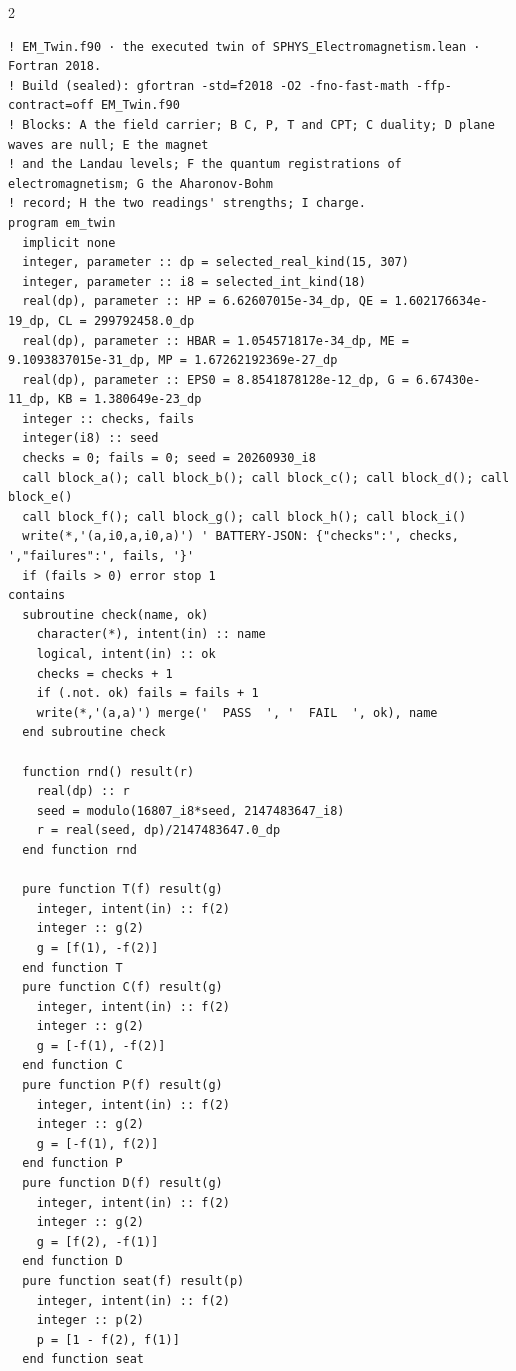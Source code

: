 \documentclass[10pt]{article}
\begin{document}
\begin{multicols}{2}
\begin{Verbatim}[fontsize=\fontsize{6.0}{6.9}\selectfont,breaklines,breakanywhere,breaksymbolleft={}]
! EM_Twin.f90 · the executed twin of SPHYS_Electromagnetism.lean · Fortran 2018.
! Build (sealed): gfortran -std=f2018 -O2 -fno-fast-math -ffp-contract=off EM_Twin.f90
! Blocks: A the field carrier; B C, P, T and CPT; C duality; D plane waves are null; E the magnet
! and the Landau levels; F the quantum registrations of electromagnetism; G the Aharonov-Bohm
! record; H the two readings' strengths; I charge.
program em_twin
  implicit none
  integer, parameter :: dp = selected_real_kind(15, 307)
  integer, parameter :: i8 = selected_int_kind(18)
  real(dp), parameter :: HP = 6.62607015e-34_dp, QE = 1.602176634e-19_dp, CL = 299792458.0_dp
  real(dp), parameter :: HBAR = 1.054571817e-34_dp, ME = 9.1093837015e-31_dp, MP = 1.67262192369e-27_dp
  real(dp), parameter :: EPS0 = 8.8541878128e-12_dp, G = 6.67430e-11_dp, KB = 1.380649e-23_dp
  integer :: checks, fails
  integer(i8) :: seed
  checks = 0; fails = 0; seed = 20260930_i8
  call block_a(); call block_b(); call block_c(); call block_d(); call block_e()
  call block_f(); call block_g(); call block_h(); call block_i()
  write(*,'(a,i0,a,i0,a)') ' BATTERY-JSON: {"checks":', checks, ',"failures":', fails, '}'
  if (fails > 0) error stop 1
contains
  subroutine check(name, ok)
    character(*), intent(in) :: name
    logical, intent(in) :: ok
    checks = checks + 1
    if (.not. ok) fails = fails + 1
    write(*,'(a,a)') merge('  PASS  ', '  FAIL  ', ok), name
  end subroutine check

  function rnd() result(r)
    real(dp) :: r
    seed = modulo(16807_i8*seed, 2147483647_i8)
    r = real(seed, dp)/2147483647.0_dp
  end function rnd

  pure function T(f) result(g)
    integer, intent(in) :: f(2)
    integer :: g(2)
    g = [f(1), -f(2)]
  end function T
  pure function C(f) result(g)
    integer, intent(in) :: f(2)
    integer :: g(2)
    g = [-f(1), -f(2)]
  end function C
  pure function P(f) result(g)
    integer, intent(in) :: f(2)
    integer :: g(2)
    g = [-f(1), f(2)]
  end function P
  pure function D(f) result(g)
    integer, intent(in) :: f(2)
    integer :: g(2)
    g = [f(2), -f(1)]
  end function D
  pure function seat(f) result(p)
    integer, intent(in) :: f(2)
    integer :: p(2)
    p = [1 - f(2), f(1)]
  end function seat


\end{Verbatim}
\end{multicols}
\end{document}
